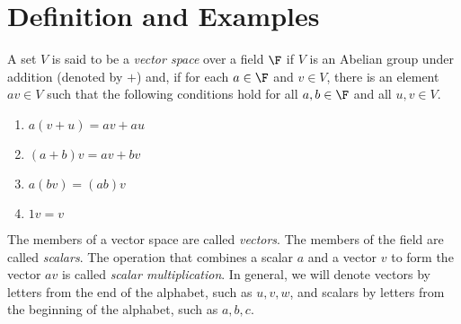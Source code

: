 \section{Definition and Examples}

\begin{definition}
	A set $V$ is said to be a \textit{vector space} over a field $\F$ if $V$ is an Abelian group under addition (denoted by $+$) and, if for each $a \in \F$ and $v \in V$, there is an element $av \in V$ such that the following conditions hold for all $a,b \in \F$ and all $u,v \in V$.
	\begin{enumerate}
		\item $a(v + u) = av + au$
		\item $(a + b)v = av + bv$
		\item $a(bv)=(ab)v$
		\item $1v=v$
	\end{enumerate}
\end{definition}

\begin{remark}
	The members of a vector space are called \textit{vectors}. The members of the field are called \textit{scalars}. The operation that combines a scalar $a$ and a vector $v$ to form the vector $av$ is called \textit{scalar multiplication}. In general, we will denote vectors by letters from the end of the alphabet, such as $u,v,w$, and scalars by letters from the beginning of the alphabet, such as $a,b,c$.
\end{remark}
